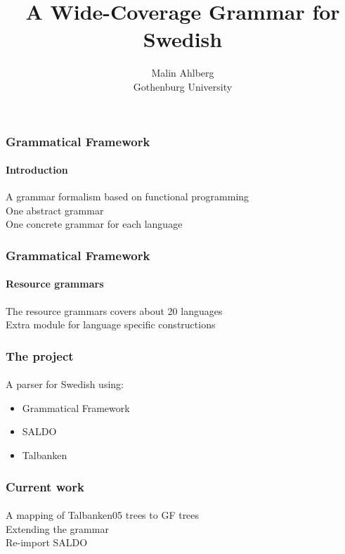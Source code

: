 \documentclass[10pt]{beamer}
\title{A Wide-Coverage Grammar for Swedish}
\author{Malin Ahlberg \\ Gothenburg University}
\date{}
\begin{document}
\maketitle

 \begin{frame}
  \frametitle{Grammatical Framework}
  \framesubtitle{Introduction}
  A grammar formalism based on functional programming \\
  \vspace{5mm}
  \pause
  One abstract grammar   \\
  \pause
  One concrete grammar for each language \\
 \end{frame}

 \begin{frame}
  \frametitle{Grammatical Framework}
  \framesubtitle{Resource grammars}
  The resource grammars covers about 20 languages \\
  \vspace{5mm}
  \pause
  Extra module for language specific constructions
 \end{frame}


\begin{frame}
\frametitle{The project}
\framesubtitle{} 
A parser for Swedish using:
\begin{itemize}
\item{Grammatical Framework}
\item{SALDO}
\item{Talbanken}
\end{itemize}
\end{frame}



\begin{frame}
\frametitle{Current work}
\framesubtitle{} 
A mapping of Talbanken05 trees to GF trees\\
  \pause
Extending the grammar \\
  \pause
Re-import SALDO\\
\end{frame}
\end{document}

